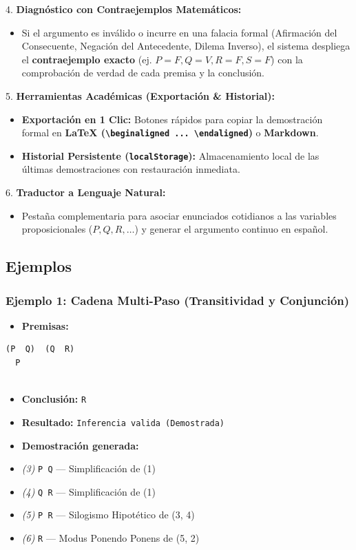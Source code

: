 \documentclass[11pt,a4paper,openany]{book}
\begin{document}
4. \textbf{Diagnóstico con Contraejemplos Matemáticos:}
\begin{itemize}[leftmargin=*]
\item Si el argumento es inválido o incurre en una falacia formal (Afirmación del Consecuente, Negación del Antecedente, Dilema Inverso), el sistema despliega el \textbf{contraejemplo exacto} (ej. $P=F, Q=V, R=F, S=F$) con la comprobación de verdad de cada premisa y la conclusión.
\end{itemize}

5. \textbf{Herramientas Académicas (Exportación \& Historial):}
\begin{itemize}[leftmargin=*]
\item \textbf{Exportación en 1 Clic:} Botones rápidos para copiar la demostración formal en \textbf{LaTeX (\texttt{\textbackslash{}begin{aligned} ... \textbackslash{}end{aligned}})} o \textbf{Markdown}.
\item \textbf{Historial Persistente (\texttt{localStorage}):} Almacenamiento local de las últimas demostraciones con restauración inmediata.
\end{itemize}

6. \textbf{Traductor a Lenguaje Natural:}
\begin{itemize}[leftmargin=*]
\item Pestaña complementaria para asociar enunciados cotidianos a las variables proposicionales ($P, Q, R, \dots$) y generar el argumento continuo en español.
\end{itemize}

\hrulefill

\subsection{Ejemplos}

\subsubsection{Ejemplo 1: Cadena Multi-Paso (Transitividad y Conjunción)}
\begin{itemize}[leftmargin=*]
\item \textbf{Premisas:}
\end{itemize}
\begin{lstlisting}[language={},basicstyle=\ttfamily\scriptsize]
  (P  Q)  (Q  R)
  P
  
\end{lstlisting}
\begin{itemize}[leftmargin=*]
\item \textbf{Conclusión:} \texttt{R}
\item \textbf{Resultado:} \texttt{Inferencia valida (Demostrada)}
\item \textbf{Demostración generada:}
\item \textit{(3)} \texttt{P  Q} --- Simplificación de (1)
\item \textit{(4)} \texttt{Q  R} --- Simplificación de (1)
\item \textit{(5)} \texttt{P  R} --- Silogismo Hipotético de (3, 4)
\item \textit{(6)} \texttt{R} --- Modus Ponendo Ponens de (5, 2)
\end{itemize}
\end{document}
